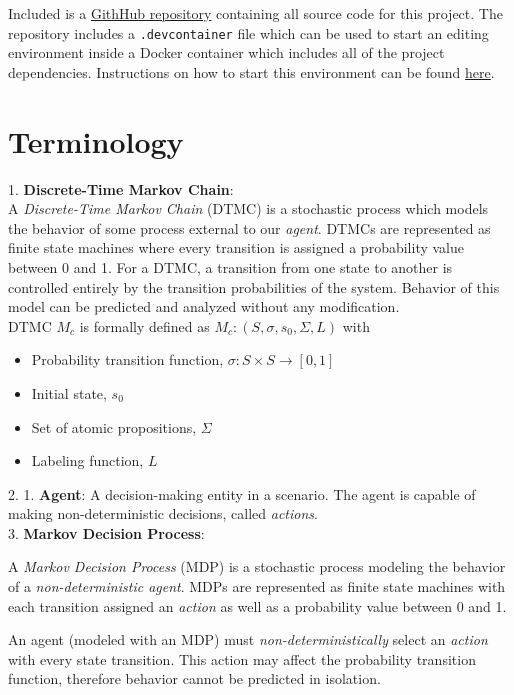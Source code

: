 \documentclass{article}
\begin{document}
Included is a \href{https://github.com/chuckdud/COMS412-Final-Project}{GithHub repository} containing all source code for this project. The repository includes a \texttt{.devcontainer} file which can be used to start an editing environment inside a Docker container which includes all of the project dependencies. Instructions on how to start this environment can be found \href{https://code.visualstudio.com/docs/devcontainers/containers}{here}.

\section{Terminology}
1. \textbf{Discrete-Time Markov Chain}: \\

A \textit{Discrete-Time Markov Chain} (DTMC) is a stochastic process which models the behavior of some process external to our \textit{agent}. DTMCs are represented as finite state machines where every transition is assigned a probability value between 0 and 1. For a DTMC, a transition from one state to another is controlled entirely by the transition probabilities of the system. Behavior of this model can be predicted and analyzed without any modification. \\

DTMC $M_c$ is formally defined as $M_c: (S, \sigma, s_0, \Sigma, L)$ with 
\begin{itemize}
    \setlength\itemsep{0em}
    \item Probability transition function, $\sigma: S \times S \rightarrow [0, 1]$
    \item Initial state, $s_0$
    \item Set of atomic propositions, $\Sigma$
    \item Labeling function, $L$
\end{itemize}

2. 1. \textbf{Agent}: A decision-making entity in a scenario. The agent is capable of making non-deterministic decisions, called \textit{actions}.\\

3. \textbf{Markov Decision Process}:

A \textit{Markov Decision Process} (MDP) is a stochastic process modeling the behavior of a \textit{non-deterministic agent}. MDPs are represented as finite state machines with each transition assigned an \textit{action} as well as a probability value between 0 and 1. 

An agent (modeled with an MDP) must \textit{non-deterministically} select an \textit{action} with every state transition. This action may affect the probability transition function, therefore behavior cannot be predicted in isolation.
\end{document}
